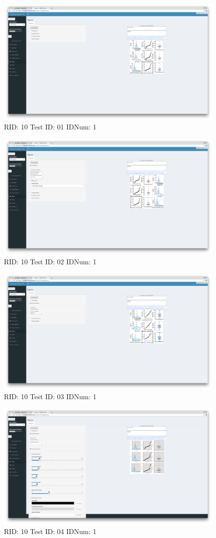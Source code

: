 \begin{figure}[H]
\includegraphics[width=.8\textwidth]{screencaps/10-01-1.png}
\caption{RID: 10 Test ID: 01 IDNum: 1}
\end{figure}
\begin{figure}[H]
\includegraphics[width=.8\textwidth]{screencaps/10-02-1.png}
\caption{RID: 10 Test ID: 02 IDNum: 1}
\end{figure}
\begin{figure}[H]
\includegraphics[width=.8\textwidth]{screencaps/10-03-1.png}
\caption{RID: 10 Test ID: 03 IDNum: 1}
\end{figure}
\begin{figure}[H]
\includegraphics[width=.8\textwidth]{screencaps/10-04-1.png}
\caption{RID: 10 Test ID: 04 IDNum: 1}
\end{figure}
